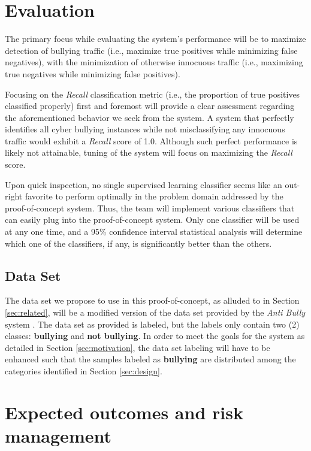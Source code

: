 \documentclass[conference]{sig-alternate-05-2015}
\begin{document}
\section{Evaluation}\label{sec:evaluation}

The primary focus while evaluating the system's performance will be to maximize
detection of bullying traffic (i.e., maximize true positives while minimizing
false negatives), with the minimization of otherwise innocuous traffic (i.e.,
maximizing true negatives while minimizing false positives).

Focusing on the \textit{Recall} classification metric (i.e., the proportion of true
positives classified properly) first and foremost will provide a clear assessment
regarding the aforementioned behavior we seek from the system. A system that
perfectly identifies all cyber bullying instances while not misclassifying any
innocuous traffic would exhibit a \textit{Recall} score of 1.0. Although such perfect
performance is likely not attainable, tuning of the system will focus on
maximizing the \textit{Recall} score.

Upon quick inspection, no single supervised learning classifier seems like an
out-right favorite to perform optimally in the problem domain addressed by the
proof-of-concept system. Thus, the team will implement various classifiers that
can easily plug into the proof-of-concept system. Only one classifier will be
used at any one time, and a 95\% confidence interval statistical analysis will
determine which one of the classifiers, if any, is significantly better than the
others.

\subsection{Data Set}\label{sec:dataset}
The data set we propose to use in this proof-of-concept, as alluded to in Section
\ref{sec:related}, will be a modified version of the data set provided by the
\textit{Anti Bully} system \cite{Li2016}. The data set as provided is labeled,
but the labels only contain two (2) classes: \textbf{bullying} and
\textbf{not bullying}. In order to meet the goals for the system as detailed in
Section \ref{sec:motivation}, the data set labeling will have to be
enhanced such that the samples labeled as \textbf{bullying} are distributed
among the categories identified in Section \ref{sec:design}.

\section{Expected outcomes and risk management}\label{sec:expectations}
\end{document}
